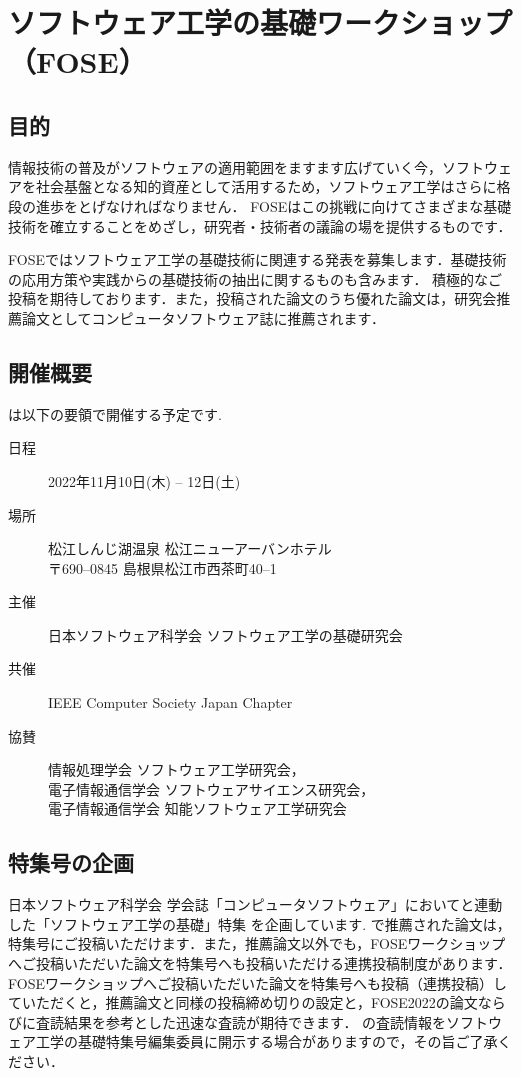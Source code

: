 \documentclass[T,J]{fose} %
\begin{document}
\section{ソフトウェア工学の基礎ワークショップ（FOSE）}
\subsection{目的}
情報技術の普及がソフトウェアの適用範囲をますます広げていく今，ソフトウェアを社会基盤となる知的資産として活用するため，ソフトウェア工学はさらに格段の進歩をとげなければなりません．
FOSEはこの挑戦に向けてさまざまな基礎技術を確立することをめざし，研究者・技術者の議論の場を提供するものです．

FOSEではソフトウェア工学の基礎技術に関連する発表を募集します．基礎技術の応用方策や実践からの基礎技術の抽出に関するものも含みます．
積極的なご投稿を期待しております．また，投稿された論文のうち優れた論文は，研究会推薦論文としてコンピュータソフトウェア誌に推薦されます．


\subsection{開催概要}
\foseabbrev\cite{fose2023}は以下の要領で開催する予定です.
\begin{description}
\item[日程] 2022年11月10日(木) -- 12日(土)
\item[場所] 松江しんじ湖温泉 松江ニューアーバンホテル\\
{\footnotesize
   〒690--0845 島根県松江市西茶町40--1
}
\item[主催] 日本ソフトウェア科学会 ソフトウェア工学の基礎研究会
\item[共催] IEEE Computer Society Japan Chapter
\item[協賛] 情報処理学会 ソフトウェア工学研究会，\\
	電子情報通信学会 ソフトウェアサイエンス研究会，\\
	電子情報通信学会 知能ソフトウェア工学研究会
\end{description}


\subsection{特集号の企画}
日本ソフトウェア科学会 学会誌「コンピュータソフトウェア」において{\foseabbrev}と連動した「ソフトウェア工学の基礎」特集 を企画しています.
{\foseabbrev}で推薦された論文は，特集号にご投稿いただけます．また，推薦論文以外でも，FOSEワークショップへご投稿いただいた論文を特集号へも投稿いただける連携投稿制度があります．
FOSEワークショップへご投稿いただいた論文を特集号へも投稿（連携投稿）していただくと，推薦論文と同様の投稿締め切りの設定と，FOSE2022の論文ならびに査読結果を参考とした迅速な査読が期待できます．
{\foseabbrev}の査読情報をソフトウェア工学の基礎特集号編集委員に開示する場合がありますので，その旨ご了承ください．
\end{document}
